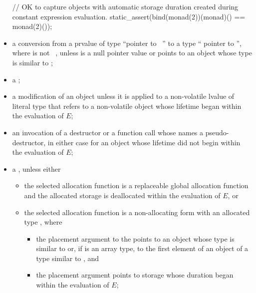\begin{itemize}
\begin{note}
\begin{example}
\begin{codeblock}
// OK to capture objects with automatic storage duration created during constant expression evaluation.
static_assert(bind(monad(2))(monad)() == monad(2)());
\end{codeblock}
\end{example}
\end{note}

\item
a conversion
from a prvalue  of type ``pointer to \cv{}~''
to a type `` pointer to  '',
where   is not ~,
unless 
is a null pointer value or
points to an object whose type is similar to ;

\item
a ;

\item
a modification of an object
unless it is applied to a non-volatile lvalue of literal type
that refers to a non-volatile object
whose lifetime began within the evaluation of $E$;

\item
an invocation of a destructor or a function call
whose  names a pseudo-destructor,
in either case for an object whose lifetime did not begin within the evaluation of $E$;

\item
a ,
unless either
\begin{itemize}
\item
the selected allocation function is
a replaceable global allocation function and
the allocated storage is deallocated within the evaluation of $E$, or
\item
the selected allocation function is
a non-allocating form
with an allocated type , where
\begin{itemize}
\item
the placement argument to the  points to
an object whose type is similar to  or,
if  is an array type,
to the first element of an object of a type similar to , and
\item
the placement argument points to storage
whose duration began within the evaluation of $E$;
\end{itemize}
\end{itemize}


\end{itemize}
